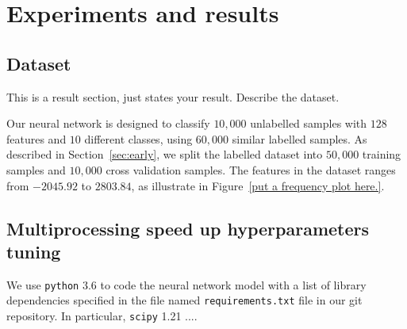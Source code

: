 \section{Experiments and results}\label{chapter4}

\subsection{Dataset}

This is a result section, just states your result. Describe the dataset.

Our neural network is designed to classify $10,000$ unlabelled samples with $128$ features and $10$ different classes, using $60,000$ similar labelled samples. As described in Section~\ref{sec:early}, we split the labelled dataset into $50,000$ training samples and $10,000$ cross validation samples. The features in the dataset ranges from $-2045.92$ to $2803.84$, as illustrate in Figure~\ref{put a frequency plot here.}.





\subsection{Multiprocessing speed up hyperparameters tuning}
We use \texttt{python} 3.6 to code the neural network model with a list of library dependencies specified in the file named \texttt{requirements.txt} file in our git repository. In particular, \texttt{scipy} 1.21 ....

